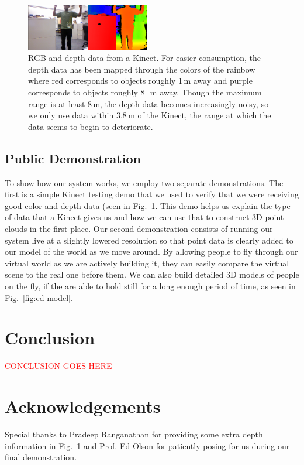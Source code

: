\documentclass[letterpaper, 10pt, conference]{ieeeconf}
\newcommand{\xxx}[1]{\textcolor{red}{#1}}
\begin{document}
\begin{figure}
\centering
\includegraphics[width=0.48\textwidth]{figures/KinectDemo.png}
\caption{RGB and depth data from a Kinect. For easier consumption, the depth
data has been mapped through the colors of the rainbow where red corresponds
to objects roughly 1\,m away and purple corresponds to objects roughly 8~\,m
away. Though the maximum range is at least 8\,m, the depth data
becomes increasingly noisy, so we only use data within 3.8\,m of the Kinect,
the range at which the data seems to begin to deteriorate.}
\label{fig:kinect-demo}
\end{figure}

\subsection{Public Demonstration}
To show how our system works, we employ two separate demonstrations. The first
is a simple Kinect testing demo that we used to verify that we were receiving
good color and depth data (seen in Fig.~\ref{fig:kinect-demo}. This demo helps
us explain the type of data that a Kinect gives us and how we can use that to
construct 3D point clouds in the first place. Our second demonstration
consists of running our system live at a slightly lowered resolution so that
point data is clearly added to our model of the world as we move around. By
allowing people to fly through our virtual world as we are actively building
it, they can easily compare the virtual scene to the real one before them. We
can also build detailed 3D models of people on the fly, if the are able to
hold still for a long enough period of time, as seen in Fig.~\ref{fig:ed-model}.

\section{Conclusion}
\xxx{CONCLUSION GOES HERE}

\section*{Acknowledgements}
Special thanks to Pradeep Ranganathan for providing some extra depth
information in Fig.~\ref{fig:kinect-demo} and Prof. Ed Olson for patiently
posing for us during our final demonstration.



\end{document}
